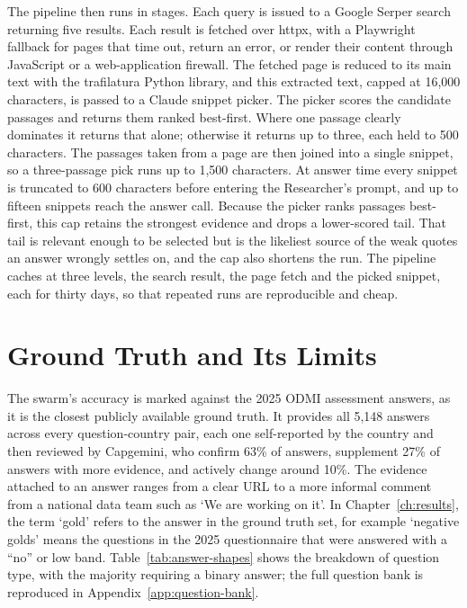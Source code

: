 The pipeline then runs in stages. Each query is issued to a Google Serper search returning five results. Each result is fetched over httpx, with a Playwright fallback for pages that time out, return an error, or render their content through JavaScript or a web-application firewall. The fetched page is reduced to its main text with the trafilatura Python library, and this extracted text, capped at 16,000 characters, is passed to a Claude snippet picker. The picker scores the candidate passages and returns them ranked best-first. Where one passage clearly dominates it returns that alone; otherwise it returns up to three, each held to 500 characters. The passages taken from a page are then joined into a single snippet, so a three-passage pick runs up to 1,500 characters. At answer time every snippet is truncated to 600 characters before entering the Researcher's prompt, and up to fifteen snippets reach the answer call. Because the picker ranks passages best-first, this cap retains the strongest evidence and drops a lower-scored tail. That tail is relevant enough to be selected but is the likeliest source of the weak quotes an answer wrongly settles on, and the cap also shortens the run. The pipeline caches at three levels, the search result, the page fetch and the picked snippet, each for thirty days, so that repeated runs are reproducible and cheap. 

\section{Ground Truth and Its Limits}\label{sec:ground-truth}

The swarm's accuracy is marked against the 2025 ODMI assessment answers, as it is the closest publicly available ground truth. It provides all 5,148 answers across every question-country pair, each one self-reported by the country and then reviewed by Capgemini, who confirm 63\% of answers, supplement 27\% of answers with more evidence, and actively change around 10\%. The evidence attached to an answer ranges from a clear URL to a more informal comment from a national data team such as `We are working on it'. In Chapter~\ref{ch:results}, the term `gold' refers to the answer in the ground truth set, for example `negative golds' means the questions in the 2025 questionnaire that were answered with a ``no'' or low band. Table~\ref{tab:answer-shapes} shows the breakdown of question type, with the majority requiring a binary answer; the full question bank is reproduced in Appendix~\ref{app:question-bank}.

